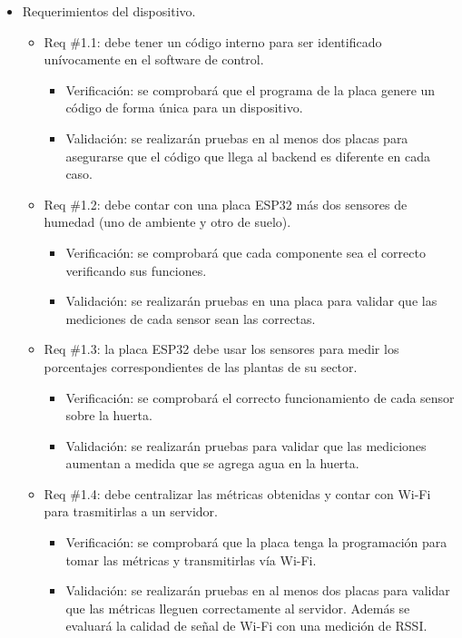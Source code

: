 \documentclass[
11pt, %
codirector, %
]{charter}
\begin{document}
\begin{itemize}
\item Requerimientos del dispositivo.
	\begin{itemize}
	\item Req \#1.1: debe tener un código interno para ser identificado unívocamente en el software de control.
		\begin{itemize}
		\item Verificación: se comprobará que el programa de la placa genere un código de forma única para un dispositivo.
		\item Validación: se realizarán pruebas en al menos dos placas para asegurarse que el código que llega al backend es diferente en cada caso.\\
		\end{itemize}
		
	\item Req \#1.2: debe contar con una placa ESP32 más dos sensores de humedad (uno de ambiente y otro de suelo).
		\begin{itemize}
		\item Verificación: se comprobará que cada componente sea el correcto verificando sus funciones.
		\item Validación: se realizarán pruebas en una placa para validar que las mediciones de cada sensor sean las correctas.\\
		\end{itemize}
		
	\item Req \#1.3: la placa ESP32 debe usar los sensores para medir los porcentajes correspondientes de las plantas de su sector.
		\begin{itemize}
		\item Verificación: se comprobará el correcto funcionamiento de cada sensor sobre la huerta.
		\item Validación: se realizarán pruebas para validar que las mediciones aumentan a medida que se agrega agua en la huerta.\\
		\end{itemize}
		 
	\item Req \#1.4: debe centralizar las métricas obtenidas y contar con Wi-Fi para trasmitirlas a un servidor.
		\begin{itemize}
		\item Verificación: se comprobará que la placa tenga la programación para tomar las métricas y transmitirlas vía Wi-Fi.
		\item Validación: se realizarán pruebas en al menos dos placas para validar que las métricas lleguen correctamente al servidor. Además se evaluará la calidad de señal de Wi-Fi con una medición de RSSI.\\
		\end{itemize}
		 

\end{itemize}
\end{itemize}
\end{document}
